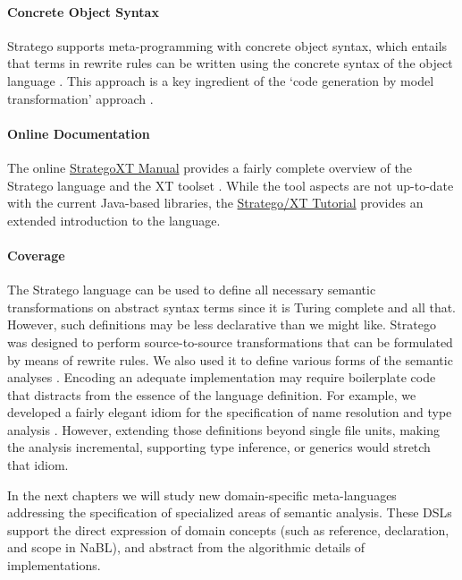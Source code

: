 \paragraph{Concrete Object Syntax}

Stratego supports meta-programming with concrete object syntax, which entails
that terms in rewrite rules can be written using the concrete syntax of the
object language \cite{Visser02}. 
This approach is a key ingredient of the `code generation by model
transformation' approach \cite{HemelKGV10}.


\paragraph{Online Documentation}

The online
\href{http://hydra.nixos.org/job/strategoxt-docs/strategoxt-manual/html/latest/download/1/manual/chunk-chapter/index.html}{StrategoXT
Manual} provides a fairly complete overview of
the Stratego language and the XT toolset \cite{StrategoXTReferenceManual}.
While the tool aspects are not up-to-date with the current Java-based libraries,
the \href{http://hydra.nixos.org/job/strategoxt-docs/strategoxt-manual/html/latest/download/1/manual/chunk-chapter/tutorial.html}{Stratego/XT Tutorial} 
provides an extended introduction to the language.



\paragraph{Coverage}

The Stratego language can be used to define all necessary semantic
transformations on abstract syntax terms since it is Turing complete and all
that. However, such definitions may be less declarative than we might like.
Stratego was designed to perform source-to-source transformations that can be
formulated by means of rewrite rules.
We also used it to define various forms of the semantic analyses
\cite{BravenboerDOV06}.
Encoding an adequate implementation may require boilerplate code that distracts
from the essence of the language definition.
For example, we developed a fairly elegant idiom for the specification of name
resolution and type analysis \cite{KatsV10,HemelKGV10,HemelGKV11}.
However, extending those definitions beyond single file units, making the
analysis incremental, supporting type inference, or generics would stretch that
idiom.

In the next chapters we will study new domain-specific meta-languages addressing
the specification of specialized areas of semantic analysis. 
These DSLs support the direct expression of domain concepts (such as reference,
declaration, and scope in NaBL), and abstract from the algorithmic details of
implementations.




